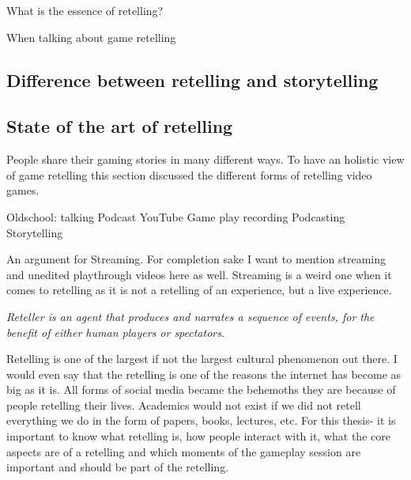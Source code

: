 What is the essence of retelling? 

When talking about game retelling 


\subsection{Difference between retelling and storytelling}
\subsection{State of the art of retelling}
People share their gaming stories in many different ways. To have an holistic view of game retelling this section discussed the different forms of retelling video games.

Oldschool: talking
Podcast
YouTube
    Game play recording
        Podcasting
    Storytelling
    

An argument for Streaming.
For completion sake I want to mention streaming and unedited playthrough videos here as well. Streaming is a weird one when it comes to retelling as it is not a retelling of an experience, but a live experience.
    




\textit{Reteller is an agent that produces and narrates a sequence of events, for the benefit of either human players or spectators}\cite{Gallotta2024LLM}.

Retelling is one of the largest if not the largest cultural phenomenon out there. I would even say that the retelling is one of the reasons the internet has become as big as it is. All forms of social media became the behemoths they are because of people retelling their lives. Academics would not exist if we did not retell everything we do in the form of papers, books, lectures, etc. For this thesis- it is important to know what retelling is, how people interact with it, what the core aspects are of a retelling and which moments of the gameplay session are important and should be part of the retelling.